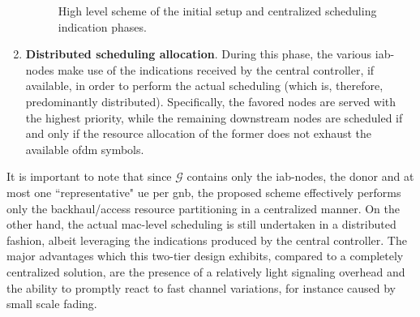 \begin{enumerate}
\begin{figure}[t!]
	\centering
  	\hfill
    \caption{High level scheme of the initial setup and centralized scheduling indication phases.}
    \label{Fig:Phases}
\end{figure}


\item \textbf{Distributed scheduling allocation}. During this phase, the various \gls{iab}-nodes make use of the indications received by the central controller, if available, in order to perform the actual scheduling (which is, therefore, predominantly distributed). Specifically, the favored nodes are served with the highest priority, while the remaining downstream nodes are scheduled if and only if the resource allocation of the former does not exhaust the available \gls{ofdm} symbols.
\end{enumerate}
It is important to note that since $\mathcal{G}$ contains only the \gls{iab}-nodes, the donor and at most one ``representative" \gls{ue} per \gls{gnb}, the proposed scheme effectively performs only the backhaul/access resource partitioning in a centralized manner. On the other hand, the actual \gls{mac}-level scheduling is still undertaken in a distributed fashion, albeit leveraging the indications produced by the central controller. The major advantages which this two-tier design exhibits, compared to a completely centralized solution, are the presence of a relatively light signaling overhead and the ability to promptly react to fast channel variations, for instance caused by small scale fading.  

